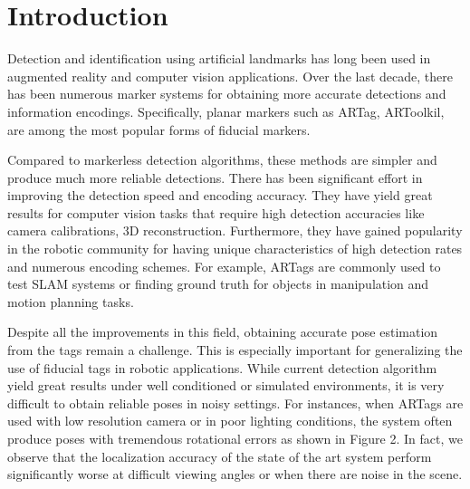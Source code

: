 \section{Introduction}
\label{sec:intro}
Detection and identification using artificial landmarks has long been used in augmented reality and computer vision applications. Over the last decade, there has been numerous marker systems for obtaining more accurate detections and information encodings. Specifically, planar markers such as ARTag, ARToolkil, are among the most popular forms of fiducial markers.

Compared to markerless detection algorithms, these methods are simpler and produce much more reliable detections. There has been significant effort in improving the detection speed and encoding accuracy. They have yield great results for computer vision tasks that require high detection accuracies like camera calibrations, 3D reconstruction. Furthermore, they have gained popularity in the robotic community for having unique characteristics of high detection rates and numerous encoding schemes. For example, ARTags are commonly used to test SLAM systems or finding ground truth for objects in manipulation and motion planning tasks. 

Despite all the improvements in this field, obtaining accurate pose estimation from the tags remain a challenge. This is especially important for generalizing the use of fiducial tags in robotic applications. While current detection algorithm yield great results under well conditioned or simulated environments, it is very difficult to obtain reliable poses in noisy settings. For instances, when ARTags are used with low resolution camera or in poor lighting conditions, the system often produce poses with tremendous rotational errors as shown in Figure 2. In fact, we observe that the localization accuracy of the state of the art system perform significantly worse at difficult viewing angles or when there are noise in the scene. 

